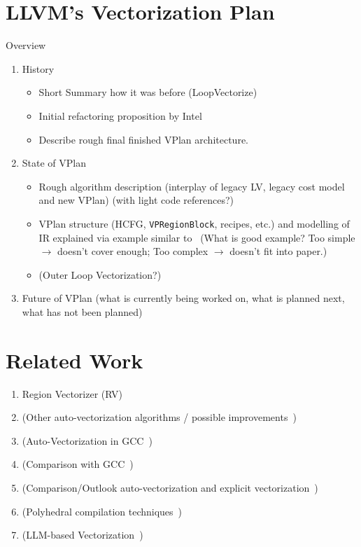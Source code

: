 \documentclass[sigplan,11pt,nonacm]{acmart}
\begin{document}
\section{LLVM's Vectorization Plan}
\label{sec:vplan}
  Overview~\cite{llvmvec,llvmvplan,llvmextloopvec,llvmintrvplan,llvmvplanstate,llvmvplanrv,llvmouterloop,llvmvplanupdate}
\begin{enumerate}
  \item History
  \begin{itemize}
    \item Short Summary how it was before (LoopVectorize)
    \item Initial refactoring proposition by Intel
    \item Describe rough final finished VPlan architecture.
  \end{itemize}
  \item State of VPlan
  \begin{itemize}
    \item Rough algorithm description (interplay of legacy LV, legacy cost model and new VPlan) (with light code references?)
    \item VPlan structure (HCFG, \texttt{VPRegionBlock}, recipes, etc.) and modelling of IR explained via example similar to~\cite{llvmvplanstate} (What is good example? Too simple $\rightarrow$ doesn't cover enough; 
    Too complex $\rightarrow$ doesn't fit into paper.)
    \item (Outer Loop Vectorization?)
  \end{itemize}
  \item Future of VPlan (what is currently being worked on, what is planned next, what has not been planned)
\end{enumerate}




\section{Related Work}
\label{sec:relatedwork}
\begin{enumerate}
  \item Region Vectorizer (RV)~\cite{llvmvplanrv,10.1145/3192366.3192413}
  \item (Other auto-vectorization algorithms / possible improvements~\cite{10.5555/3615924.3615932,4336219,llvmveccontrolflow,saarlandrv,10.1145/3303117.3306172})
  \item (Auto-Vectorization in GCC~\cite{autovecoptgcc, vecoptgcc})
  \item (Comparison with GCC~\cite{gccllvmveccomp,10.1155/2021/3264624})
  \item (Comparison/Outlook auto-vectorization and explicit vectorization~\cite{10.1155/2021/3264624, 9802745, DBLP:conf/vldb/BensonER23})
  \item (Polyhedral compilation techniques~\cite{llvmpolyhedral})
  \item (LLM-based Vectorization~\cite{taneja2024llmvectorizerllmbasedverifiedloop})
\end{enumerate}
\end{document}
